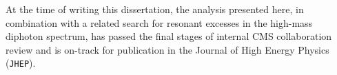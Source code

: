 At the time of writing this dissertation, the analysis presented here, in combination with a related search for resonant excesses in the high-mass diphoton spectrum, has passed the final stages of internal CMS collaboration review and is on-track for publication in the Journal of High Energy Physics (\texttt{JHEP}).


